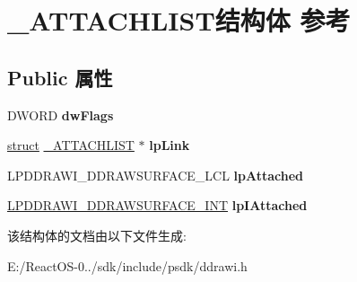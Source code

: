 \hypertarget{struct___a_t_t_a_c_h_l_i_s_t}{}\section{\+\_\+\+A\+T\+T\+A\+C\+H\+L\+I\+S\+T结构体 参考}
\label{struct___a_t_t_a_c_h_l_i_s_t}
\subsection*{Public 属性}
\begin{DoxyCompactItemize}
\item 
\mbox{\label{struct___a_t_t_a_c_h_l_i_s_t_a5b73317ce4c46a318a86549f404fe1b7}} 
D\+W\+O\+RD {\bfseries dw\+Flags}
\item 
\mbox{\label{struct___a_t_t_a_c_h_l_i_s_t_a70666d4a9a62bcaf553559cbe89895d5}} 
\hyperlink{interfacestruct}{struct} \hyperlink{struct___a_t_t_a_c_h_l_i_s_t}{\+\_\+\+A\+T\+T\+A\+C\+H\+L\+I\+ST} $\ast$ {\bfseries lp\+Link}
\item 
\mbox{\label{struct___a_t_t_a_c_h_l_i_s_t_afeabace0dc311f49ab89a8da3133c263}} 
L\+P\+D\+D\+R\+A\+W\+I\+\_\+\+D\+D\+R\+A\+W\+S\+U\+R\+F\+A\+C\+E\+\_\+\+L\+CL {\bfseries lp\+Attached}
\item 
\mbox{\label{struct___a_t_t_a_c_h_l_i_s_t_a56f6d3b0a21fbe93c47a774c8eb22231}} 
\hyperlink{struct___d_d_r_a_w_i___d_d_r_a_w_s_u_r_f_a_c_e___i_n_t}{L\+P\+D\+D\+R\+A\+W\+I\+\_\+\+D\+D\+R\+A\+W\+S\+U\+R\+F\+A\+C\+E\+\_\+\+I\+NT} {\bfseries lp\+I\+Attached}
\end{DoxyCompactItemize}


该结构体的文档由以下文件生成\+:\begin{DoxyCompactItemize}
\item 
E\+:/\+React\+O\+S-\/0../sdk/include/psdk/ddrawi.\+h\end{DoxyCompactItemize}
